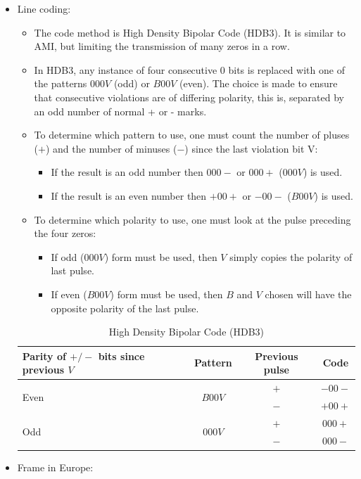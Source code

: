 \documentclass[../main.tex]{subfiles}
\begin{document}
\begin{itemize}
	\item {
		Line coding:
		\begin{itemize}
			\item The code method is High Density Bipolar Code (HDB3). It is similar to AMI, but limiting the transmission of many zeros in a row.
			\item In HDB3, any instance of four consecutive 0 bits is replaced with one of the patterns $000V$ (odd) or $B00V$ (even). The choice is made to ensure that consecutive violations are of differing polarity, this is, separated by an odd number of normal + or - marks.
			\item {
				To determine which pattern to use, one must count the number of pluses ($+$) and the number of minuses ($-$) since the last violation bit V:
				\begin{itemize}
					\item If the result is an odd number then $000-$ or $000+$ ($000V$) is used.
					\item If the result is an even number then $+00+$ or $-00-$ ($B00V$) is used.
				\end{itemize}
			}
			\item {
				To determine which polarity to use, one must look at the pulse preceding the four zeros:
				\begin{itemize}
					\item If odd ($000V$) form must be used, then $V$ simply copies the polarity of last pulse.
					\item If even ($B00V$) form must be used, then $B$ and $V$ chosen will have the opposite polarity of the last pulse.
				\end{itemize}
			}
		\end{itemize}
		\begin{table}
			\centering
			\begin{tabular}{|l|c|c|c|}
				\hline
				Parity of $+/-$ bits since previous $V$	& Pattern					& Previous pulse	& Code \\
				\hline
				\multirow{2}{*}{Even}					& \multirow{2}{*}{$B00V$}	& $+$				& $-00-$ \\
				\cline{3-4}
														&							& $-$				& $+00+$ \\
				\hline
				\multirow{2}{*}{Odd}					& \multirow{2}{*}{$000V$}	& $+$				& $000+$ \\
				\cline{3-4}
														&							& $-$				& $000-$ \\
				\hline
			\end{tabular}
			\caption{
				\label{tab:HDB3}
				High Density Bipolar Code (HDB3)
			}
		\end{table}
	}
	\item {
		Frame in Europe:

}
\end{itemize}
\end{document}
